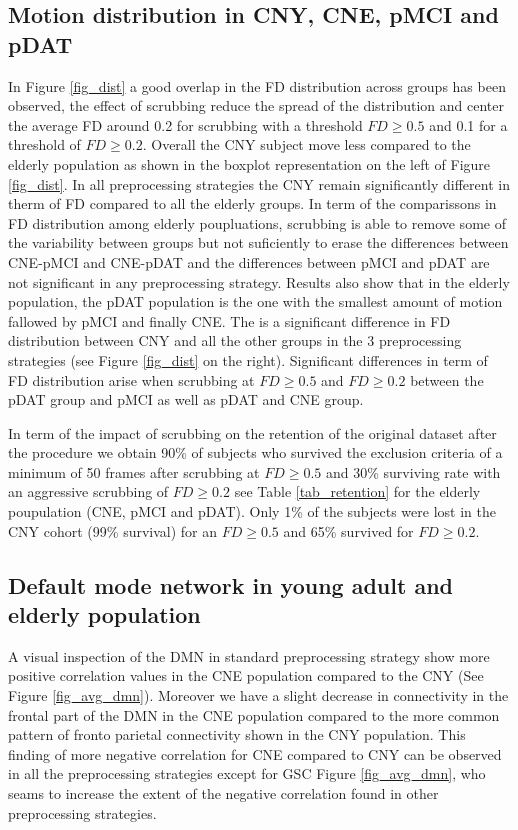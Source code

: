 \documentclass[authoryear]{elsarticle}
\begin{document}
\subsection{Motion distribution in CNY, CNE, pMCI and pDAT}
In Figure \ref{fig_dist} a good overlap in the FD distribution across groups has been observed, the effect of scrubbing reduce the spread of the distribution and center the average FD around 0.2 for scrubbing with a threshold $FD\geq0.5$ and 0.1 for a threshold of $FD\geq0.2$. Overall the CNY subject move less compared to the elderly population as shown in the boxplot representation on the left of Figure \ref{fig_dist}. In all preprocessing strategies the CNY remain significantly different in therm of FD compared to all the elderly groups. In term of the comparissons in FD distribution among elderly poupluations, scrubbing is able to remove some of the variability between groups but not suficiently to erase the differences between CNE-pMCI and CNE-pDAT and the differences between pMCI and pDAT are not significant in any preprocessing strategy. Results also show that in the elderly population, the pDAT population is the one with the smallest amount of motion fallowed by pMCI and finally CNE. The is a significant difference in FD distribution between CNY and all the other groups in the 3 preprocessing strategies (see Figure \ref{fig_dist} on the right). Significant differences in term of FD distribution arise when scrubbing at $FD\geq0.5$ and $FD\geq0.2$ between the pDAT group and pMCI as well as pDAT and CNE group.

In term of the impact of scrubbing on the retention of the original dataset after the procedure we obtain 90\% of subjects who survived the exclusion criteria of a minimum of 50 frames after scrubbing at $FD\geq0.5$ and 30\% surviving rate with an aggressive scrubbing of $FD\geq0.2$ see Table \ref{tab_retention} for the elderly poupulation (CNE, pMCI and pDAT). Only 1\% of the subjects were lost in the CNY cohort (99\% survival) for an $FD\geq0.5$ and 65\% survived for $FD\geq0.2$.

\subsection{Default mode network in young adult and elderly population}
A visual inspection of the DMN in standard preprocessing strategy show more positive correlation values in the CNE population compared to the CNY (See Figure \ref{fig_avg_dmn}). Moreover we have a slight decrease in connectivity in the frontal part of the DMN in the CNE population compared to the more common pattern of fronto parietal connectivity shown in the CNY population. This finding of more negative correlation for CNE compared to CNY can be observed in all the preprocessing strategies except for GSC Figure \ref{fig_avg_dmn}, who seams to increase the extent of the negative correlation found in other preprocessing strategies.
\end{document}
